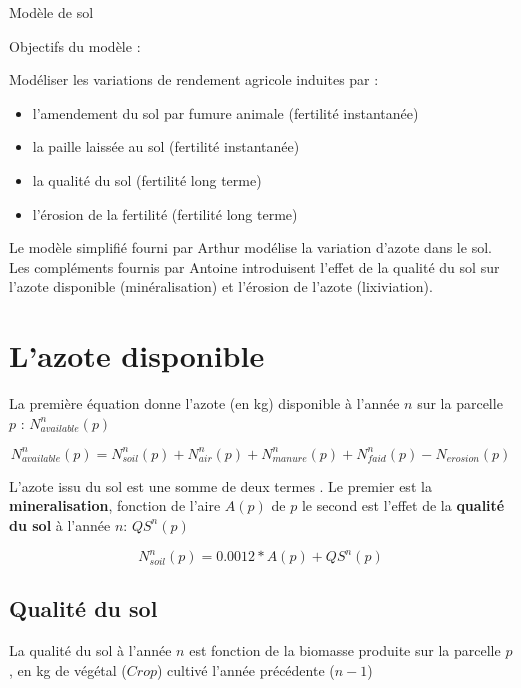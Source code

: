 \documentclass[10pt,a4paper,french]{article} %
\begin{document}
Modèle de sol 

Objectifs du modèle :


Modéliser les variations de rendement agricole induites par : 

\begin{itemize}
	\item l'amendement du sol par fumure animale  (fertilité instantanée)
	\item la paille laissée au sol (fertilité instantanée)
	\item la qualité du sol (fertilité long terme)
	\item l'érosion de la fertilité (fertilité long terme)
\end{itemize} 

\vspace{0.5cm}
Le modèle simplifié fourni par Arthur modélise la variation d'azote dans le sol. 
Les compléments fournis par Antoine introduisent l'effet de la qualité du sol sur l'azote disponible (minéralisation) et l'érosion de l'azote (lixiviation). 



\section{L'azote disponible}



La première équation donne l'azote (en kg) disponible à l'année $n$ sur la parcelle $p$ : $N_{available}^{n}(p)$

\begin{equation}
N_{available}^{n}(p)=N_{soil}^{n}(p)+N_{air}^{n}(p)+N_{manure}^{n}(p)+N_{faid}^{n}(p)-N_{erosion}(p)
\end{equation}


L'azote issu du sol est une somme de deux termes . Le premier est la \textbf{mineralisation}, fonction de l'aire $A(p)$ de $p$ le second est l'effet de la \textbf{qualité du sol} à l'année $n$:  $QS^{n}(p)$

\begin{equation}
N_{soil}^{n}(p) = 0.0012 * A(p) + QS^{n}(p)
\end{equation}



\subsection{Qualité du sol}

La qualité du sol à l'année $n$ est fonction de la biomasse produite sur la parcelle $p$ , en kg de végétal ($Crop$) cultivé l'année précédente ($n-1$)
\end{document}
